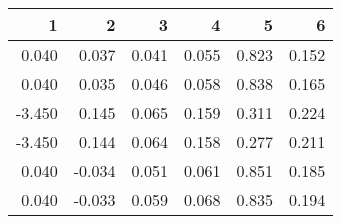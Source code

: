 \begin{table}[ht]
\centering
\begin{tabular}{rrrrrr}
  \hline
1 & 2 & 3 & 4 & 5 & 6 \\ 
  \hline
0.040 & 0.037 & 0.041 & 0.055 & 0.823 & 0.152 \\ 
  0.040 & 0.035 & 0.046 & 0.058 & 0.838 & 0.165 \\ 
  -3.450 & 0.145 & 0.065 & 0.159 & 0.311 & 0.224 \\ 
  -3.450 & 0.144 & 0.064 & 0.158 & 0.277 & 0.211 \\ 
  0.040 & -0.034 & 0.051 & 0.061 & 0.851 & 0.185 \\ 
  0.040 & -0.033 & 0.059 & 0.068 & 0.835 & 0.194 \\ 
   \hline
\end{tabular}
\end{table}
